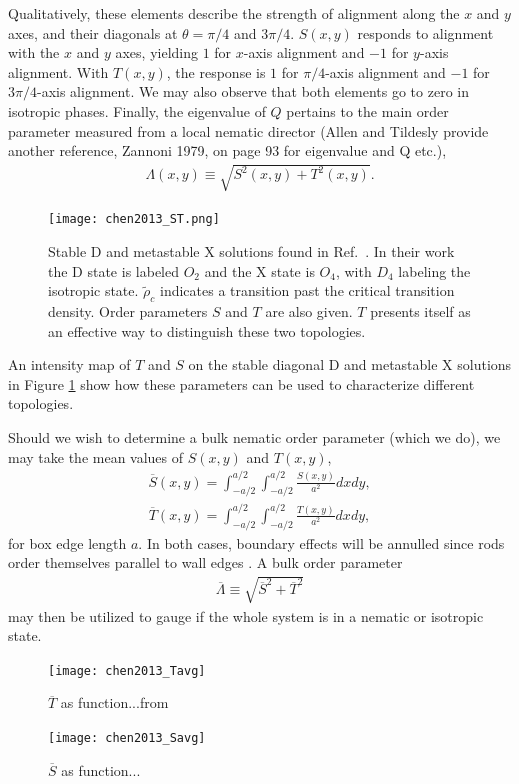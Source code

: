 Qualitatively, these elements describe the strength of alignment along the $x$ and $y$ axes, and their diagonals at $\theta=\pi/4$ and $3\pi/4$. $S(x,y)$ responds to alignment with the $x$ and $y$ axes, yielding $1$ for $x$-axis alignment and $-1$ for $y$-axis alignment. With $T(x,y)$, the response is $1$ for $\pi/4$-axis alignment and $-1$ for $3\pi/4$-axis alignment. We may also observe that both elements go to zero in isotropic phases. Finally, the eigenvalue of $Q$ pertains to the main order parameter measured from a local nematic director (Allen and Tildesly provide another reference, Zannoni 1979, on page 93 for eigenvalue and Q etc.),
\begin{align}
	\Lambda(x,y) \equiv \sqrt{S^2(x,y) + T^2(x,y)}.
	\label{e q:Lambda}
\end{align}

\begin{figure}
	\centering
	\texttt{[image: chen2013\_ST.png]}
	\caption{Stable D and metastable X solutions found in Ref.\ \cite{chen2013rods}. In their work the D state is labeled $O_2$ and the X state is $O_4$, with $D_4$ labeling the isotropic state. $\tilde{\rho}_c$ indicates a transition past the critical transition density. Order parameters $S$ and $T$ are also given. $T$ presents itself as an effective way to distinguish these two topologies.}
	\label{fig:TSmap}
\end{figure}

An intensity map of $T$ and $S$ on the stable diagonal D and metastable X solutions in Figure \ref{fig:TSmap} show how these parameters can be used to characterize different topologies.

Should we wish to determine a bulk nematic order parameter (which we do), we may take the mean values of $S(x,y)$ and $T(x,y)$,
\begin{align}
	\overline{S}(x,y) = \int_{-a/2}^{a/2} \int_{-a/2}^{a/2}\frac{S(x,y)}{a^2} dxdy,
\end{align}
\begin{align}
\overline{T}(x,y) = \int_{-a/2}^{a/2} \int_{-a/2}^{a/2}\frac{T(x,y)}{a^2} dxdy,
\end{align}
for box edge length $a$. In both cases, boundary effects will be annulled since rods order themselves parallel to wall edges \cite{wallordering}. A bulk order parameter 
\begin{align}
	\overline{\Lambda} \equiv \sqrt{\overline{S}^2 + \overline{T}^2}
\end{align}
may then be utilized to gauge if the whole system is in a nematic or isotropic state.

\begin{figure}
	\centering
	\texttt{[image: chen2013\_Tavg]}
	\caption{$\overline{T}$ as function...from \cite{chen2013rods}}
\end{figure}

\begin{figure}
	\centering
	\texttt{[image: chen2013\_Savg]}
	\caption{$\overline{S}$ as function...\cite{chen2013rods}}
\end{figure}






